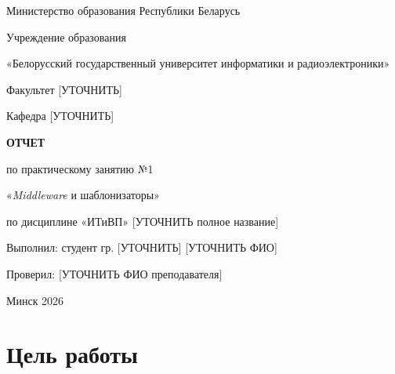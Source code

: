 \documentclass[14pt,a4paper]{extarticle}
\begin{document}
\thispagestyle{empty}
{\centering \fontsize{14pt}{18pt}\selectfont Министерство образования Республики Беларусь\par}
{\centering \fontsize{14pt}{18pt}\selectfont Учреждение образования\par}
{\centering \fontsize{14pt}{18pt}\selectfont «Белорусский государственный университет информатики и радиоэлектроники»\par}
\vspace{18pt}
{\centering \fontsize{14pt}{18pt}\selectfont Факультет [УТОЧНИТЬ]\par}
{\centering \fontsize{14pt}{18pt}\selectfont Кафедра [УТОЧНИТЬ]\par}
\vspace{18pt}
\vspace{18pt}
\vspace{18pt}
\vspace{18pt}
{\centering \bfseries \fontsize{16pt}{18pt}\selectfont ОТЧЕТ\par}
{\centering \fontsize{14pt}{18pt}\selectfont по практическому занятию №1\par}
{\centering \fontsize{14pt}{18pt}\selectfont «\textit{Middleware} и шаблонизаторы»\par}
{\centering \fontsize{14pt}{18pt}\selectfont по дисциплине «ИТиВП» [УТОЧНИТЬ полное название]\par}
\vspace{18pt}
\vspace{18pt}
\vspace{18pt}
\vspace{18pt}
\vspace{18pt}
\hspace*{8cm}\parbox[t]{7cm}{\raggedright Выполнил: студент гр. [УТОЧНИТЬ] [УТОЧНИТЬ ФИО]}\par
\hspace*{8cm}\parbox[t]{7cm}{\raggedright Проверил: [УТОЧНИТЬ ФИО преподавателя]}\par
\vspace{18pt}
\vspace{18pt}
\vspace{18pt}
\vspace{18pt}
\vspace{18pt}
{\centering \fontsize{14pt}{18pt}\selectfont Минск 2026\par}
\newpage
\section{Цель работы}
\end{document}
